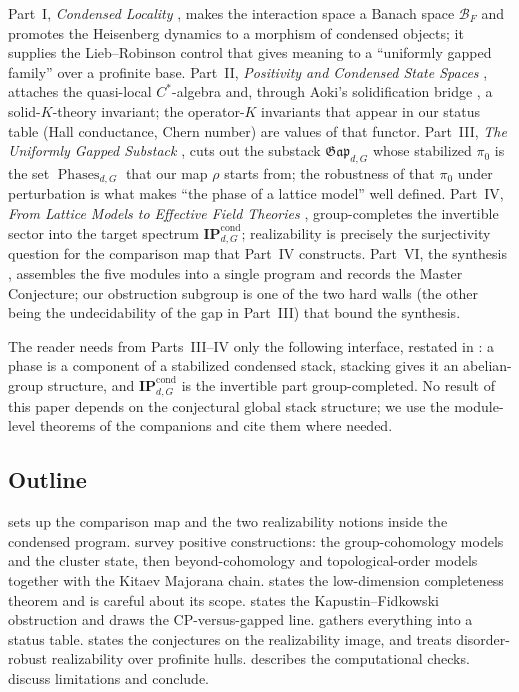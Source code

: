 \documentclass[12pt]{article}
\newcommand{\BF}{\mathcal{B}_{F}}              %
\newcommand{\Gap}{\mathfrak{Gap}}              %
\newcommand{\Phases}{\operatorname{Phases}}    %
\newcommand{\IPcond}{\mathbf{IP}^{\mathrm{cond}}}  %
\newcommand{\real}{\rho}                         %
\newcommand{\CP}{\mathrm{CP}}                    %
\theoremstyle{definition}
\theoremstyle{remark}
\begin{document}
Part~I, \emph{Condensed Locality} \cite{paperLocality}, makes the interaction space a Banach
space $\BF$ and promotes the Heisenberg dynamics to a morphism of condensed objects; it
supplies the Lieb--Robinson control that gives meaning to a ``uniformly gapped family'' over
a profinite base. Part~II, \emph{Positivity and Condensed State Spaces}
\cite{paperPositivity}, attaches the quasi-local $C^*$-algebra and, through Aoki's
solidification bridge \cite{aoki-solidification}, a solid-$K$-theory invariant; the
operator-$K$ invariants that
appear in our status table (Hall conductance, Chern number) are values of that functor.
Part~III, \emph{The Uniformly Gapped Substack} \cite{paperGap}, cuts out the substack
$\Gap_{d,G}$ whose stabilized $\pi_0$ is the set $\Phases_{d,G}$ that our map $\real$ starts
from; the robustness of that $\pi_0$ under perturbation is what makes ``the phase of a
lattice model'' well defined. Part~IV, \emph{From Lattice Models to Effective Field
Theories} \cite{paperEFT}, group-completes the invertible sector into the target spectrum
$\IPcond_{d,G}$; realizability is precisely the surjectivity question for the comparison map
that Part~IV constructs. Part~VI, the synthesis \cite{paperSynthesis}, assembles the five
modules into a single program and records the Master Conjecture; our obstruction subgroup is
one of the two hard walls (the other being the undecidability of the gap in Part~III) that
bound the synthesis.

The reader needs from Parts~III--IV only the following interface, restated in
: a phase is a component of a stabilized condensed stack, stacking gives
it an abelian-group structure, and $\IPcond_{d,G}$ is the invertible part group-completed.
No result of this paper depends on the conjectural global stack structure; we use the
module-level theorems of the companions and cite them where needed.

\subsection{Outline}

 sets up the comparison map and the two realizability notions inside the
condensed program.  survey positive constructions: the
group-cohomology models and the cluster state, then beyond-cohomology and topological-order
models together with the Kitaev Majorana chain.  states the low-dimension
completeness theorem and is careful about its scope.  states the
Kapustin--Fidkowski obstruction and draws the $\CP$-versus-gapped line. 
gathers everything into a status table.  states the conjectures on the
realizability image, and  treats disorder-robust realizability over
profinite hulls.  describes the computational checks.
 discuss limitations and conclude.
\end{document}
